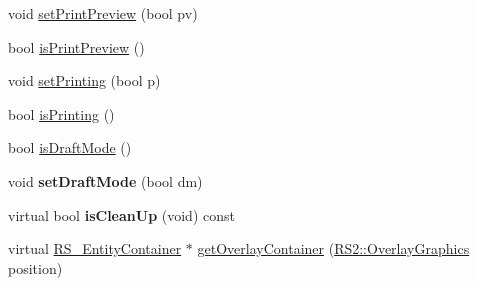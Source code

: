 \begin{DoxyCompactItemize}
\item 
void \hyperlink{classRS__GraphicView_a6990f8945d861d021a3eadd94a435e5c}{set\-Print\-Preview} (bool pv)
\item 
bool \hyperlink{classRS__GraphicView_a0d67880260eed41bff1d9cbfa3d6d3e0}{is\-Print\-Preview} ()
\item 
void \hyperlink{classRS__GraphicView_a607eeca01ea83dd27cc8fd127bce32da}{set\-Printing} (bool p)
\item 
bool \hyperlink{classRS__GraphicView_aa8deb3b1d1f1798d4bc1e4e89dc1e473}{is\-Printing} ()
\item 
bool \hyperlink{classRS__GraphicView_a47a7947d66f1afe5f1830069aa2c2f3b}{is\-Draft\-Mode} ()
\item 
\hypertarget{classRS__GraphicView_a49ec69f7d88da462295c093cfdb9096c}{void {\bfseries set\-Draft\-Mode} (bool dm)}\label{classRS__GraphicView_a49ec69f7d88da462295c093cfdb9096c}

\item 
\hypertarget{classRS__GraphicView_a30ab7a53f413f9f0e7cf48a775c886ea}{virtual bool {\bfseries is\-Clean\-Up} (void) const }\label{classRS__GraphicView_a30ab7a53f413f9f0e7cf48a775c886ea}

\item 
virtual \hyperlink{classRS__EntityContainer}{R\-S\-\_\-\-Entity\-Container} $\ast$ \hyperlink{classRS__GraphicView_a1482df8b755d79647e969fd7df09c682}{get\-Overlay\-Container} (\hyperlink{classRS2_ad08097f2c67307c83fbea0439830f56c}{R\-S2\-::\-Overlay\-Graphics} position)
\end{DoxyCompactItemize}
